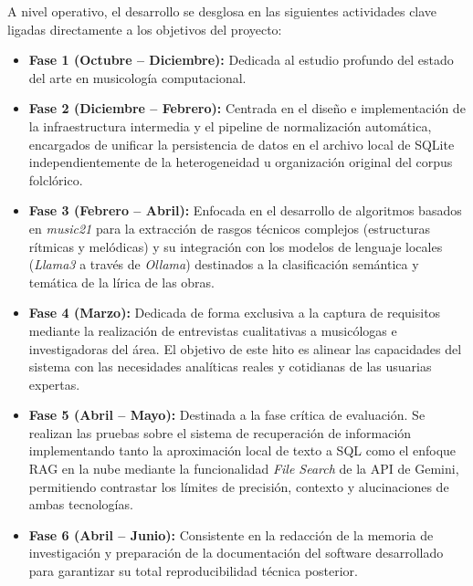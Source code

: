 A nivel operativo, el desarrollo se desglosa en las siguientes actividades clave ligadas directamente a los objetivos del proyecto:
\begin{itemize}
    \item \textbf{Fase 1 (Octubre -- Diciembre):} Dedicada al estudio profundo del estado del arte en musicología computacional.
    \item \textbf{Fase 2 (Diciembre -- Febrero):} Centrada en el diseño e implementación de la infraestructura intermedia y el pipeline de normalización automática, encargados de unificar la persistencia de datos en el archivo local de SQLite independientemente de la heterogeneidad u organización original del corpus folclórico.
    \item \textbf{Fase 3 (Febrero -- Abril):} Enfocada en el desarrollo de algoritmos basados en \textit{music21} para la extracción de rasgos técnicos complejos (estructuras rítmicas y melódicas) y su integración con los modelos de lenguaje locales (\textit{Llama3} a través de \textit{Ollama}) destinados a la clasificación semántica y temática de la lírica de las obras.
    \item \textbf{Fase 4 (Marzo):} Dedicada de forma exclusiva a la captura de requisitos mediante la realización de entrevistas cualitativas a musicólogas e investigadoras del área. El objetivo de este hito es alinear las capacidades del sistema con las necesidades analíticas reales y cotidianas de las usuarias expertas.
    \item \textbf{Fase 5 (Abril -- Mayo):} Destinada a la fase crítica de evaluación. Se realizan las pruebas sobre el sistema de recuperación de información implementando tanto la aproximación local de texto a SQL como el enfoque RAG en la nube mediante la funcionalidad \textit{File Search} de la API de Gemini, permitiendo contrastar los límites de precisión, contexto y alucinaciones de ambas tecnologías.
    \item \textbf{Fase 6 (Abril -- Junio):} Consistente en la redacción de la memoria de investigación y preparación de la documentación del software desarrollado para garantizar su total reproducibilidad técnica posterior.
\end{itemize}

